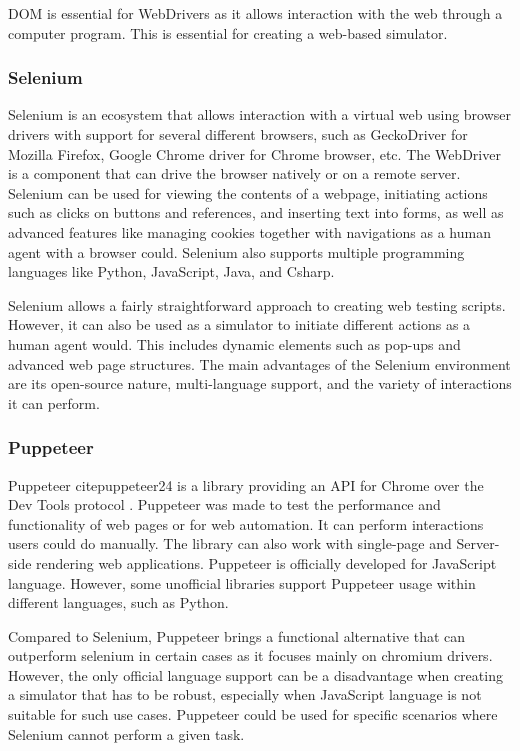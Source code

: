 DOM is essential for WebDrivers \cite{webdriver_2018} as it allows interaction with the web through a computer program. This is essential for creating a web-based simulator. 

\subsubsection{Selenium}

Selenium is an ecosystem that allows interaction with a virtual web using browser drivers with support for several different browsers, such as GeckoDriver \cite{geckodriver} for Mozilla Firefox, Google Chrome driver \cite{chromedriver} for Chrome browser, etc. The WebDriver is a component that can drive the browser natively or on a remote server. Selenium can be used for viewing the contents of a webpage, initiating actions such as clicks on buttons and references, and inserting text into forms, as well as advanced features like managing cookies together with navigations as a human agent with a browser could. Selenium also supports multiple programming languages like Python, JavaScript, Java, and Csharp. \cite{selenium_2023} 

Selenium allows a fairly straightforward approach to creating web testing scripts. However, it can also be used as a simulator to initiate different actions as a human agent would. This includes dynamic elements such as pop-ups and advanced web page structures. The main advantages of the Selenium environment are its open-source nature, multi-language support, and the variety of interactions it can perform.

\subsubsection{Puppeteer}

Puppeteer cite{puppeteer24} is a library providing an API for Chrome over the Dev Tools protocol \cite{devtools}. Puppeteer was made to test the performance and functionality of web pages or for web automation. It can perform interactions users could do manually. The library can also work with single-page and Server-side rendering web applications. Puppeteer is officially developed for JavaScript language. However, some unofficial libraries support Puppeteer usage within different languages, such as Python. \

Compared to Selenium, Puppeteer brings a functional alternative that can outperform selenium in certain cases as it focuses mainly on chromium drivers. However, the only official language support can be a disadvantage when creating a simulator that has to be robust, especially when JavaScript language is not suitable for such use cases. Puppeteer could be used for specific scenarios where Selenium cannot perform a given task. 


